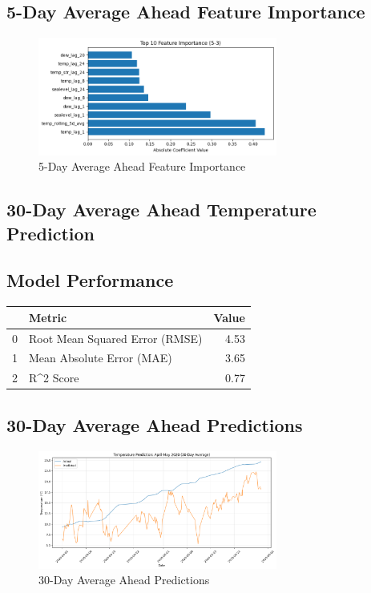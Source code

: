 \subsection{5-Day Average Ahead Feature Importance}
\begin{figure}[htbp]
\centering
\includegraphics[width=0.7\textwidth]{5-3-linear_temp_feature_importance.png}
\caption{5-Day Average Ahead Feature Importance}
\label{fig:5-day_average_ahead_featimp}
\end{figure}



\subsection{30-Day Average Ahead Temperature Prediction}
\subsection{Model Performance}
\begin{tabular}{llr}
\toprule
 & Metric & Value \\
\midrule
0 & Root Mean Squared Error (RMSE) & 4.53 \\
1 & Mean Absolute Error (MAE) & 3.65 \\
2 & R^2 Score & 0.77 \\
\bottomrule
\end{tabular}

\subsection{30-Day Average Ahead Predictions}
\begin{figure}[htbp]
\centering
\includegraphics[width=0.7\textwidth]{5-4-linear_temp_prediction_results.png}
\caption{30-Day Average Ahead Predictions}
\label{fig:30-day_average_ahead_pred}
\end{figure}

